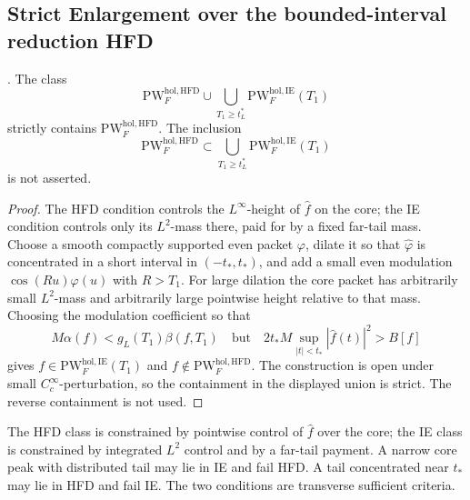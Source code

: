 \subsection{Strict Enlargement over the bounded-interval reduction HFD}
\label{v4-arith:w7-e:strict-enlargement}

\begin{proposition}
\label{v4-arith:w7-e:prop:strict-inclusion}
\ClaimStatusProvedHere. The class
\[
\mathrm{PW}^{\mathrm{hol},\mathrm{HFD}}_{F}\cup
\bigcup_{T_{1}\geq t_{L}^{\ast}}\mathrm{PW}^{\mathrm{hol},\mathrm{IE}}_{F}(T_{1})
\]
strictly contains \(\mathrm{PW}^{\mathrm{hol},\mathrm{HFD}}_{F}\). The
inclusion
\[
\mathrm{PW}^{\mathrm{hol},\mathrm{HFD}}_{F}\subset
\bigcup_{T_{1}\geq t_{L}^{\ast}}\mathrm{PW}^{\mathrm{hol},\mathrm{IE}}_{F}(T_{1})
\]
is not asserted.
\end{proposition}

\begin{proof}
The HFD condition controls the \(L^{\infty}\)-height of
\(\widehat f\) on the core; the IE condition controls only its
\(L^{2}\)-mass there, paid for by a fixed far-tail mass. Choose a
smooth compactly supported even packet \(\varphi\), dilate it so that
\(\widehat\varphi\) is concentrated in a short interval in
\((-t_{\ast},t_{\ast})\), and add a small even modulation
\(\cos(Ru)\varphi(u)\) with \(R>T_{1}\). For large dilation the core
packet has arbitrarily small \(L^{2}\)-mass and arbitrarily large
pointwise height relative to that mass. Choosing the modulation
coefficient so that
\[
M\alpha(f)<g_{L}(T_{1})\beta(f,T_{1})
\quad\text{but}\quad
2t_{\ast}M\sup_{|t|<t_{\ast}}|\widehat f(t)|^{2}>B[f]
\]
gives \(f\in\mathrm{PW}^{\mathrm{hol},\mathrm{IE}}_{F}(T_{1})\) and
\(f\notin\mathrm{PW}^{\mathrm{hol},\mathrm{HFD}}_{F}\). The construction is
open under small \(C^{\infty}_{c}\)-perturbation, so the containment in
the displayed union is strict. The reverse containment is not used.
\end{proof}

\begin{remark}
\label{v4-arith:w7-e:rem:IE-advantage}
The HFD class is constrained by pointwise control of \(\widehat{f}\)
over the core; the IE class is constrained by integrated \(L^{2}\)
control and by a far-tail payment. A narrow core peak with distributed
tail may lie in IE and fail HFD. A tail concentrated near
\(t_{\ast}\) may lie in HFD and fail IE. The two conditions are
transverse sufficient criteria.
\end{remark}


